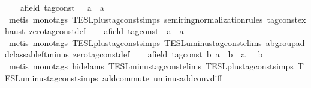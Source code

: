 \begin{isabellebody}
\ \ \isamarkupfalse%
\ {\isacartoucheopen}{\isasymAnd}{\isacharparenleft}a{\isacharcolon}{\isacharcolon}{\isacharparenleft}{\isacharprime}{\isasymtau}{\isacharcolon}{\isacharcolon}field\ tag{\isacharunderscore}const{\isacharparenright}{\isacharparenright}{\isachardot}\ {}\ {\isacharplus}\ a\ {\isacharequal}\ a{\isacartoucheclose}\isanewline
\ \ \ \ \isamarkupfalse%
\ {\isacharparenleft}metis\ {\isacharparenleft}mono{\isacharunderscore}tags{\isacharparenright}\ TESL{\isachardot}plus{\isacharunderscore}tag{\isacharunderscore}const{\isachardot}simps\ semiring{\isacharunderscore}normalization{\isacharunderscore}rules{\isacharparenleft}{}{\isacharparenright}\ tag{\isacharunderscore}const{\isachardot}exhaust\ zero{\isacharunderscore}tag{\isacharunderscore}const{\isacharunderscore}def{\isacharparenright}\isanewline
\ \ \isamarkupfalse%
\ {\isacartoucheopen}{\isasymAnd}{\isacharparenleft}a{\isacharcolon}{\isacharcolon}{\isacharparenleft}{\isacharprime}{\isasymtau}{\isacharcolon}{\isacharcolon}field\ tag{\isacharunderscore}const{\isacharparenright}{\isacharparenright}{\isachardot}\ {\isacharminus}\ a\ {\isacharplus}\ a\ {\isacharequal}\ {}{\isacartoucheclose}\isanewline
\ \ \ \ \isamarkupfalse%
\ {\isacharparenleft}metis\ {\isacharparenleft}mono{\isacharunderscore}tags{\isacharparenright}\ TESL{\isachardot}plus{\isacharunderscore}tag{\isacharunderscore}const{\isachardot}simps\ TESL{\isachardot}uminus{\isacharunderscore}tag{\isacharunderscore}const{\isachardot}elims\ ab{\isacharunderscore}group{\isacharunderscore}add{\isacharunderscore}class{\isachardot}ab{\isacharunderscore}left{\isacharunderscore}minus\ zero{\isacharunderscore}tag{\isacharunderscore}const{\isacharunderscore}def{\isacharparenright}\isanewline
\ \ \isamarkupfalse%
\ {\isacartoucheopen}{\isasymAnd}{\isacharparenleft}a{\isacharcolon}{\isacharcolon}{\isacharparenleft}{\isacharprime}{\isasymtau}{\isacharcolon}{\isacharcolon}field\ tag{\isacharunderscore}const{\isacharparenright}{\isacharparenright}\ b{\isachardot}\ a\ {\isacharminus}\ b\ {\isacharequal}\ a\ {\isacharplus}\ {\isacharminus}\ b{\isacartoucheclose}\isanewline
\ \ \ \ \isamarkupfalse%
\ {\isacharparenleft}metis\ {\isacharparenleft}mono{\isacharunderscore}tags{\isacharcomma}\ hide{\isacharunderscore}lams{\isacharparenright}\ TESL{\isachardot}minus{\isacharunderscore}tag{\isacharunderscore}const{\isachardot}elims\ TESL{\isachardot}plus{\isacharunderscore}tag{\isacharunderscore}const{\isachardot}simps\ TESL{\isachardot}uminus{\isacharunderscore}tag{\isacharunderscore}const{\isachardot}simps\ add{\isachardot}commute\ uminus{\isacharunderscore}add{\isacharunderscore}conv{\isacharunderscore}diff{\isacharparenright}\isanewline

\end{isabellebody}
